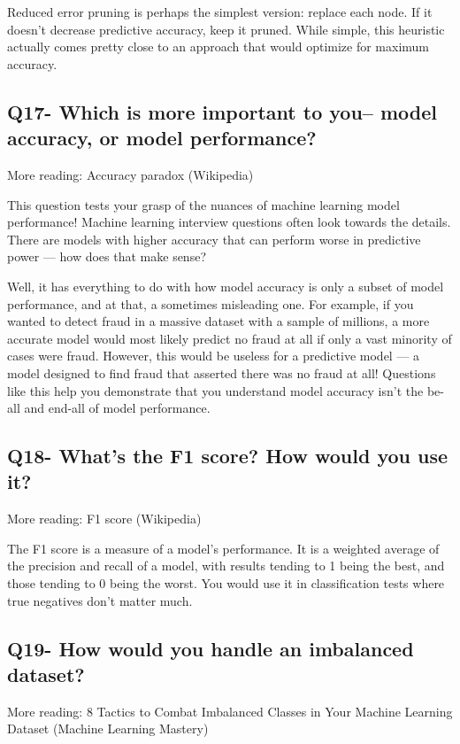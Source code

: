 \documentclass[11pt,a4paper]{article}
\begin{document}
Reduced error pruning is perhaps the simplest version: replace each node. If it doesn’t decrease predictive accuracy, keep it pruned. While simple, this heuristic actually comes pretty close to an approach that would optimize for maximum accuracy.


\subsection{Q17- Which is more important to you– model accuracy, or model performance?}

More reading: Accuracy paradox (Wikipedia)

This question tests your grasp of the nuances of machine learning model performance! Machine learning interview questions often look towards the details. There are models with higher accuracy that can perform worse in predictive power — how does that make sense?

Well, it has everything to do with how model accuracy is only a subset of model performance, and at that, a sometimes misleading one. For example, if you wanted to detect fraud in a massive dataset with a sample of millions, a more accurate model would most likely predict no fraud at all if only a vast minority of cases were fraud. However, this would be useless for a predictive model — a model designed to find fraud that asserted there was no fraud at all! Questions like this help you demonstrate that you understand model accuracy isn’t the be-all and end-all of model performance.


\subsection{Q18- What’s the F1 score? How would you use it?}

More reading: F1 score (Wikipedia)

The F1 score is a measure of a model’s performance. It is a weighted average of the precision and recall of a model, with results tending to 1 being the best, and those tending to 0 being the worst. You would use it in classification tests where true negatives don’t matter much.


\subsection{Q19- How would you handle an imbalanced dataset?}

More reading: 8 Tactics to Combat Imbalanced Classes in Your Machine Learning Dataset (Machine Learning Mastery)
\end{document}
